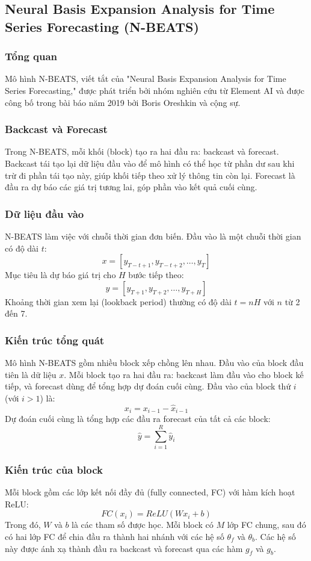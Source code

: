 \documentclass[conference]{IEEEtran}
\begin{document}
\subsection{Neural Basis Expansion Analysis for Time Series Forecasting (N-BEATS)}
\vspace{1mm}
\subsubsection{Tổng quan}
Mô hình N-BEATS, viết tắt của "Neural Basis Expansion Analysis for Time Series Forecasting," được phát triển bởi nhóm nghiên cứu từ Element AI và được công bố trong bài báo năm 2019 bởi Boris Oreshkin và cộng sự.

\subsubsection{Backcast và Forecast}
Trong N-BEATS, mỗi khối (block) tạo ra hai đầu ra: backcast và forecast. Backcast tái tạo lại dữ liệu đầu vào để mô hình có thể học từ phần dư sau khi trừ đi phần tái tạo này, giúp khối tiếp theo xử lý thông tin còn lại. Forecast là đầu ra dự báo các giá trị tương lai, góp phần vào kết quả cuối cùng.

\subsubsection{Dữ liệu đầu vào}
N-BEATS làm việc với chuỗi thời gian đơn biến. Đầu vào là một chuỗi thời gian có độ dài $t$:
\[
    x = [y_{T-t+1}, y_{T-t+2}, \ldots, y_T]
\]
Mục tiêu là dự báo giá trị cho $H$ bước tiếp theo:
\[
    y = [y_{T+1}, y_{T+2}, \ldots, y_{T+H}]
\]
Khoảng thời gian xem lại (lookback period) thường có độ dài $t = nH$ với $n$ từ 2 đến 7.

\subsubsection{Kiến trúc tổng quát}
Mô hình N-BEATS gồm nhiều block xếp chồng lên nhau. Đầu vào của block đầu tiên là dữ liệu $x$. Mỗi block tạo ra hai đầu ra: backcast làm đầu vào cho block kế tiếp, và forecast dùng để tổng hợp dự đoán cuối cùng. Đầu vào của block thứ $i$ (với $i > 1$) là:
\[
    x_i = x_{i-1} - \hat{x}_{i-1}
\]
Dự đoán cuối cùng là tổng hợp các đầu ra forecast của tất cả các block:
\[
    \hat{y} = \sum_{i=1}^{R} \hat{y}_i
\]

\subsubsection{Kiến trúc của block}
Mỗi block gồm các lớp kết nối đầy đủ (fully connected, FC) với hàm kích hoạt ReLU:
\[
    FC(x_i) = ReLU(Wx_i + b)
\]
Trong đó, $W$ và $b$ là các tham số được học. Mỗi block có $M$ lớp FC chung, sau đó có hai lớp FC để chia đầu ra thành hai nhánh với các hệ số $\theta_f$ và $\theta_b$. Các hệ số này được ánh xạ thành đầu ra backcast và forecast qua các hàm $g_f$ và $g_b$.
\end{document}
